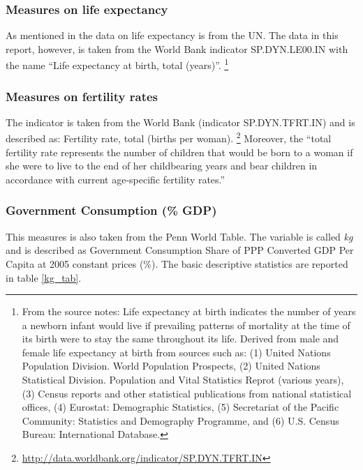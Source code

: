 \documentclass{article}\usepackage{graphicx, color}
\begin{document}
\subsubsection{Measures on life expectancy}

As mentioned in \citet[p. 11]{barro1994sources} the data on life
expectancy is from the UN. The data in this report, however, is taken
from the World Bank indicator SP.DYN.LE00.IN with the name ``Life
expectancy at birth, total (years)''.%
\footnote{From the source notes: Life expectancy at birth indicates the number
of years a newborn infant would live if prevailing patterns of mortality
at the time of its birth were to stay the same throughout its life.
Derived from male and female life expectancy at birth from sources
such as: (1) United Nations Population Division. World Population
Prospects, (2) United Nations Statistical Division. Population and
Vital Statistics Reprot (various years), (3) Census reports and other
statistical publications from national statistical offices, (4) Eurostat:
Demographic Statistics, (5) Secretariat of the Pacific Community:
Statistics and Demography Programme, and (6) U.S. Census Bureau: International
Database.%
}





\subsubsection{Measures on fertility rates}

The indicator is taken from the World Bank (indicator SP.DYN.TFRT.IN)
and is described as: Fertility rate, total (births per woman).%
\footnote{\href{http://data.worldbank.org/indicator/SP.DYN.TFRT.IN}{http://data.worldbank.org/indicator/SP.DYN.TFRT.IN}%
} Moreover, the ``total fertility rate represents the number of children
that would be born to a woman if she were to live to the end of her
childbearing years and bear children in accordance with current age-specific
fertility rates.''





\subsubsection{Government Consumption (\% GDP)}

This measures is also taken from the Penn World Table. The variable
is called \emph{kg} and is described as Government Consumption Share
of PPP Converted GDP Per Capita at 2005 constant prices (\%). The
basic descriptive statistics are reported in table \ref{kg_tab}.
\end{document}

